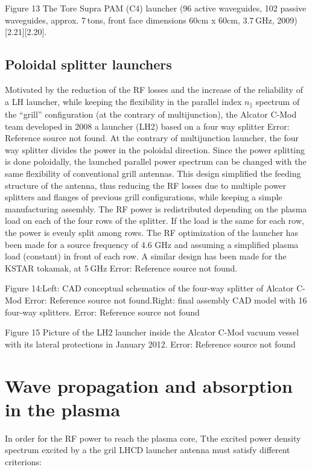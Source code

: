 Figure 13 The Tore Supra PAM (C4) launcher (96 active waveguides, 102 passive waveguides, approx. 7 tons, front face dimensions 60cm x 60cm, 3.7 GHz, 2009) [2.21][2.20].

\subsection{Poloidal splitter launchers}
Motivated by the reduction of the RF losses and the increase of the reliability of a LH launcher, while keeping the flexibility in the parallel index $n_{\parallel}$ spectrum of the “grill” configuration (at the contrary of multijunction), the Alcator C-Mod team developed in 2008 a launcher (LH2) based on a four way splitter Error: Reference source not found. At the contrary of multijunction launcher, the four way splitter divides the power in the poloidal direction. Since the power splitting is done poloidally, the launched parallel power spectrum can be changed with the same flexibility of conventional grill antennas. This design simplified the feeding structure of the antenna, thus reducing the RF losses due to multiple power splitters and flanges of previous grill configurations, while keeping a simple manufacturing assembly. The RF power is redistributed depending on the plasma load on each of the four rows of the splitter. If the load is the same for each row, the power is evenly split among rows. The RF optimization of the launcher has been made for a source frequency of 4.6 GHz and assuming a simplified plasma load (constant) in front of each row. A similar design has been made for the KSTAR tokamak, at 5 GHz Error: Reference source not found. 

Figure 14:Left: CAD conceptual schematics of the four-way splitter of Alcator C-Mod Error: Reference source not found.Right: final assembly CAD model with 16 four-way splitters. Error: Reference source not found

Figure 15 Picture of the LH2 launcher inside the Alcator C-Mod vacuum vessel with its lateral protections in January 2012. Error: Reference source not found

\section{Wave propagation and absorption in the plasma}
In order for the RF power to reach the plasma core, Tthe excited power density spectrum excited by a the gril LHCD launcher antenna must satisfy different criterions: 

